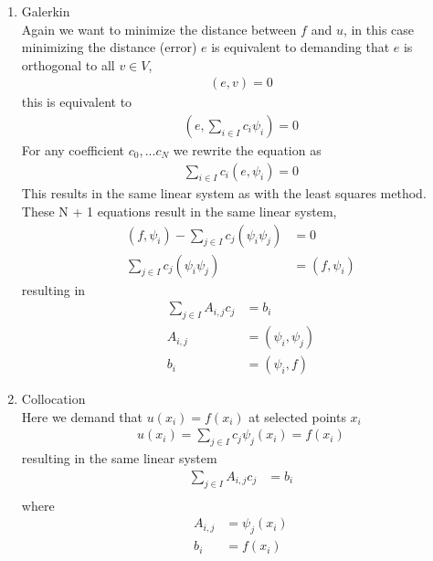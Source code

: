 \documentclass[11pt,a4paper]{article}
\begin{document}
\begin{enumerate}
\item Galerkin\\
Again we want to minimize the distance between $f$ and $u$, in this case minimizing the distance (error) $e$ is equivalent to demanding that $e$ is orthogonal to all $v \in V$,
\begin{align}
(e,v) =0
\end{align}
this is equivalent to
\begin{align*}
(e, \sum_{i\in I}c_i \psi_i) =0
\end{align*}
For any coefficient $c_0,...c_N$ we rewrite the equation as
\begin{align*}
\sum_{i\in I}c_i (e,\psi_i) =0
\end{align*}
This results in the same linear system as with the least squares method. These N + 1 equations result in the same linear system,
\begin{align*}
(f,\psi_i)-\sum_{j\in I}c_j(\psi_i\psi_j) &= 0\\
\sum_{j\in I}c_j(\psi_i\psi_j) &= (f,\psi_i)
\end{align*}
resulting in
\begin{align*}
\sum_{j\in I}A_{i,j}c_j &= b_i\\
A_{i,j} &= (\psi_i,\psi_j)\\
b_i &= (\psi_i, f)
\end{align*}
\item Collocation\\
Here we demand that $u(x_i)=f(x_i)$ at selected points $x_i$
\begin{align}
u(x_i)=\sum_{j\in I}c_j\psi_j(x_i)=f(x_i) 
\end{align}
resulting in the same linear system 
\begin{align*}
\sum_{j\in I}A_{i,j}c_j &= b_i\\
\end{align*}
where
\begin{align*}
A_{i,j} &= \psi_j(x_i)\\
b_i &= f(x_i)
\end{align*}
\end{enumerate}
\end{document}
